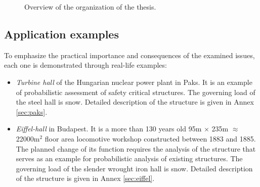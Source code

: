 \begin{figure}[htbp!]
	\caption{Overview of the organization of the thesis.}
	\label{fig:thesis_overview}
\end{figure}


\subsection{Application examples}

To emphasize the practical importance and consequences of the examined issues, each one is demonstrated through real-life examples: 
\begin{itemize}
	\item \textit{Turbine hall} of the Hungarian nuclear power plant in Paks. It is an example of probabilistic assessment of safety critical structures. The governing load of the steel hall is snow. Detailed description of the structure is given in Annex \ref{sec:paks}.
	\item \textit{Eiffel-hall} in Budapest. It is a more than 130 years old 95m $\times$ 235m $\approx$ 22000m$^2$ floor area locomotive workshop constructed between 1883 and 1885. The planned change of its function requires the analysis of the structure that serves as an example for probabilistic analysis of existing structures. The governing load of the slender wrought iron hall is snow. Detailed description of the structure is given in Annex \ref{sec:eiffel}.
\end{itemize}

